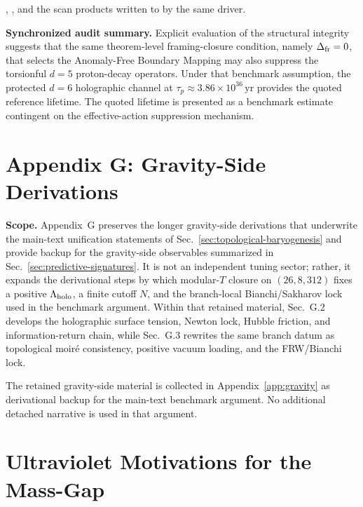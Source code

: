 \documentclass[11pt]{article}
\makeatletter
\newcommand{\manualappendixlabel}[2]{%
  \begingroup
  \def\@currentlabel{#1}%
  \label{#2}%
  \endgroup
}
\makeatother
\begin{document}
, , and the scan products written to  by the same driver. %

\noindent\textbf{Synchronized audit summary.} Explicit evaluation of the structural integrity suggests that the same theorem-level framing-closure condition, namely $\Delta_{\rm fr}=0$, that selects the Anomaly-Free Boundary Mapping may also suppress the torsionful $d=5$ proton-decay operators. Under that benchmark assumption, the protected $d=6$ holographic channel at $\tau_p\approx3.86\times10^{36}\,\mathrm{yr}$ provides the quoted reference lifetime. The quoted lifetime is presented as a benchmark estimate contingent on the effective-action suppression mechanism.

\section*{Appendix G: Gravity-Side Derivations}\manualappendixlabel{G}{app:corollaries}

\noindent\textbf{Scope.} Appendix~G preserves the longer gravity-side
derivations that underwrite the main-text unification statements of
Sec.~\ref{sec:topological-baryogenesis} and provide backup for the
gravity-side observables summarized in
Sec.~\ref{sec:predictive-signatures}. It is not an independent tuning sector;
rather, it expands the derivational steps by which modular-$T$ closure on
$(26,8,312)$ fixes a positive $\Lambda_{\rm holo}$, a finite cutoff $N$, and
the branch-local Bianchi/Sakharov lock used in the benchmark argument.
Within that retained material, Sec.~G.2 develops the holographic surface
tension, Newton lock, Hubble friction, and information-return chain, while
Sec.~G.3 rewrites the same branch datum as topological moir\'e consistency,
positive vacuum loading, and the FRW/Bianchi lock.

The retained gravity-side material is collected in Appendix~\ref{app:gravity}
as derivational backup for the main-text benchmark argument. No additional
detached narrative is used in that argument.

\section{Ultraviolet Motivations for the Mass-Gap}\label{app:n-quarter}
\end{document}
